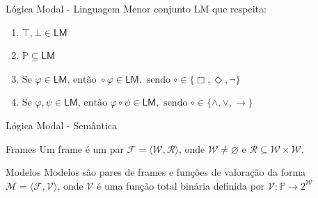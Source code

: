 \documentclass[xcolor=table]{beamer}
\renewcommand \phi{\varphi}
\let \emptyset \varnothing
\begin{document}
    \begin{frame}{Lógica Modal - Linguagem}
        Menor conjunto \textsf{LM} que respeita:

        \vspace{\baselineskip}

        \begin{enumerate}
            \item \(\top, \bot \in \mathsf{LM} \)
            \item \(\mathbb{P} \subseteq \mathsf{LM}\)
            \item \(\text{Se } \phi \in \mathsf{LM} \text{, então } \circ \phi \in \mathsf{LM}, \text{ sendo } \circ \in \{\Box, \Diamond, \neg\}\)
            \item \(\text{Se } \phi, \psi \in \mathsf{LM} \text{, então } \phi \circ \psi \in \mathsf{LM}, \text{ sendo } \circ \in \{\land, \lor, \to\}\)
        \end{enumerate}
    \end{frame}

    \begin{frame}{Lógica Modal - Semântica}
        \begin{block}{Frames}
            Um frame é um par \(\mathcal{F} = \langle \mathcal{W}, \mathcal{R} \rangle\), onde \(\mathcal{W} \neq \emptyset\) e
            \(\mathcal{R} \subseteq \mathcal{W} \times \mathcal{W}\).
        \end{block}

        \vspace{2\baselineskip}

        \begin{block}{Modelos}
            Modelos são pares de frames e funções de valoração da forma
            \({\mathcal{M} = \langle \mathcal{F}, \mathcal{V} \rangle}\), onde \(\mathcal{V}\) é uma função total binária
            definida por \(\mathcal{V}: \mathbb{P} \to 2^{\mathcal{W}}\)
        \end{block}
    \end{frame}
\end{document}
